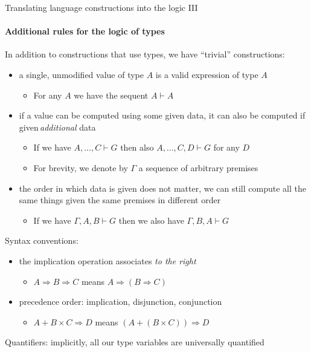 \documentclass[english]{beamer}
\begin{document}
\begin{frame}{Translating language constructions into the logic III}


\framesubtitle{Additional rules for the logic of types}

In addition to constructions that use types, we have ``trivial''
constructions:
\begin{itemize}
\item a single, unmodified value of type $A$ is a valid expression of type
$A$
\begin{itemize}
\item For any $A$ we have the sequent $A\vdash A$
\end{itemize}
\item if a value can be computed using some given data, it can also be computed
if given\,\emph{additional} data
\begin{itemize}
\item If we have $A,...,C\vdash G$ then also $A,...,C,D\vdash G$ for any
$D$
\item For brevity, we denote by $\Gamma$ a sequence of arbitrary premises
\end{itemize}
\item the order in which data is given does not matter, we can still compute
all the same things given the same premises in different order
\begin{itemize}
\item If we have $\Gamma,A,B\vdash G$ then we also have $\Gamma,B,A\vdash G$
\end{itemize}
\end{itemize}
Syntax conventions:
\begin{itemize}
\item the implication operation associates \emph{to the right}
\begin{itemize}
\item $A\Rightarrow B\Rightarrow C$ means $A\Rightarrow\left(B\Rightarrow C\right)$
\end{itemize}
\item precedence order: implication, disjunction, conjunction
\begin{itemize}
\item $A+B\times C\Rightarrow D$ means $\left(A+\left(B\times C\right)\right)\Rightarrow D$
\end{itemize}
\end{itemize}
Quantifiers: implicitly, all our type variables are universally quantified
\end{frame}
\end{document}

